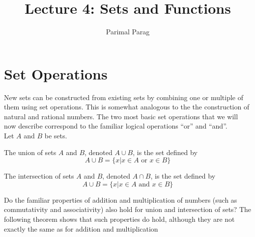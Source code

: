 \documentclass[a4paper,english,12pt]{article}
\begin{document}
\title{Lecture 4: Sets and Functions}
\author{Parimal Parag}
\maketitle

\section{Set Operations}
New sets can be constructed from existing sets by combining one or multiple of them using set operations. This is somewhat analogous to the
the construction of natural and rational numbers. The two most basic set operations that we will now describe correspond to the familiar 
logical operations ``or'' and ``and''. \\
Let $A$ and $B$ be sets. 
\begin{defn}[Union]
The union of sets $A$ and $B$, denoted $A \cup B$, is the set defined by 
\begin{equation*}
 A \cup B = \{ x | x \in A \text{ or } x \in B \}
\end{equation*}
\end{defn}

\begin{defn}[Intersection]
The intersection of sets $A$ and $B$, denoted $A \cap B$, is the set defined by 
\begin{equation*}
 A \cup B = \{ x | x \in A \text{ and } x \in B \}
\end{equation*}
\end{defn}

Do the familiar properties of addition and multiplication of numbers (such as commutativity and associativity) also hold for union and intersection of sets? The
following theorem shows that such properties do hold, although they are not exactly the same as for addition and multiplication
\end{document}
